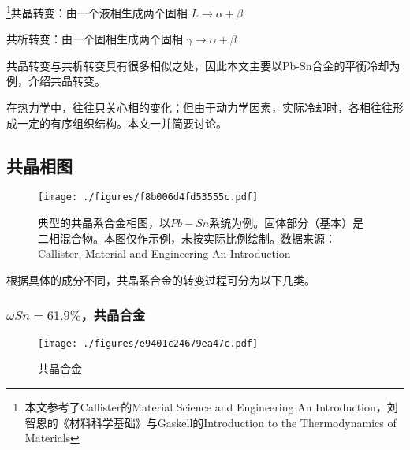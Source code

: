 

\footnote{本文参考了Callister的Material Science and Engineering An Introduction，刘智恩的《材料科学基础》与Gaskell的Introduction to the Thermodynamics of Materials}共晶转变：由一个液相生成两个固相 $L \rightarrow \alpha+\beta$

共析转变：由一个固相生成两个固相 $\gamma \rightarrow \alpha+\beta$

共晶转变与共析转变具有很多相似之处，因此本文主要以Pb-Sn合金的平衡冷却为例，介绍共晶转变。

在热力学中，往往只关心相的变化；但由于动力学因素，实际冷却时，各相往往形成一定的有序组织结构。本文一并简要讨论。

\subsection{共晶相图}
\begin{figure}[ht]
\centering
\texttt{[image: ./figures/f8b006d4fd53555c.pdf]}
\caption{典型的共晶系合金相图，以$Pb-Sn$系统为例。固体部分（基本）是二相混合物。本图仅作示例，未按实际比例绘制。数据来源：Callister, Material and Engineering An Introduction} \label{fig_EUTECT_1}
\end{figure}
根据具体的成分不同，共晶系合金的转变过程可分为以下几类。

\subsubsection{$\omega Sn=61.9\%$，共晶合金}
\begin{figure}[ht]
\centering
\texttt{[image: ./figures/e9401c24679ea47c.pdf]}
\caption{共晶合金} \label{fig_EUTECT_2}
\end{figure}

